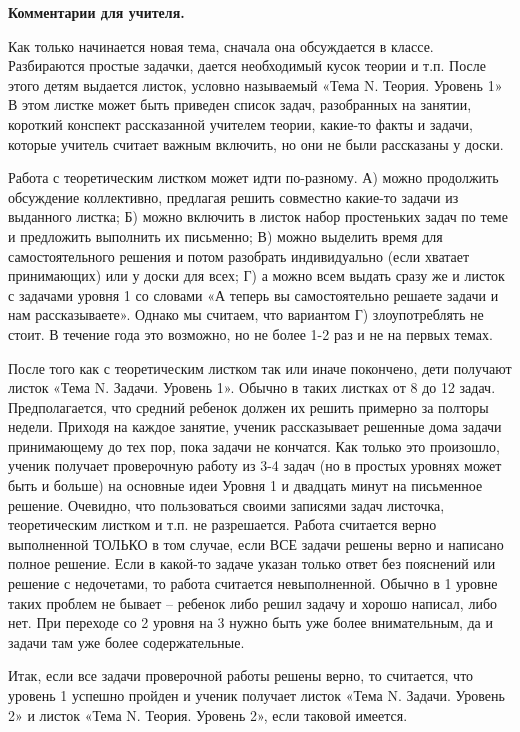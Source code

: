 \begin{center}
	\textbf{Комментарии для учителя.}
\end{center}

Как только начинается новая тема, сначала она обсуждается в классе. Разбираются простые задачки, дается необходимый кусок теории и т.п. После этого детям выдается листок, условно называемый «Тема N. Теория. Уровень 1» В этом листке может быть приведен список задач, разобранных на занятии, короткий конспект рассказанной учителем теории, какие-то факты и задачи, которые учитель считает важным включить, но они не были рассказаны у доски. 

Работа с теоретическим листком может идти по-разному. А) можно продолжить обсуждение коллективно, предлагая решить совместно какие-то задачи из выданного листка; Б) можно включить в листок набор простеньких задач по теме и предложить выполнить их письменно; В) можно выделить время для самостоятельного решения и потом разобрать индивидуально (если хватает принимающих) или у доски для всех; Г) а можно всем выдать сразу же и листок с задачами уровня 1 со словами «А теперь вы самостоятельно решаете задачи и нам рассказываете». Однако мы считаем, что вариантом Г) злоупотреблять не стоит. В течение года это возможно, но не более 1-2 раз и не на первых темах.

После того как с теоретическим листком так или иначе покончено, дети получают листок «Тема N. Задачи. Уровень 1». Обычно в таких листках от 8 до 12 задач. Предполагается, что средний ребенок должен их решить примерно за полторы недели. Приходя на каждое занятие, ученик рассказывает решенные дома задачи принимающему до тех пор, пока задачи не кончатся. Как только это произошло, ученик получает проверочную работу из 3-4 задач (но в простых уровнях может быть и больше) на основные идеи Уровня 1 и двадцать минут на письменное решение. Очевидно, что пользоваться своими записями задач листочка, теоретическим листком и т.п. не разрешается. 
Работа считается верно выполненной ТОЛЬКО в том случае, если ВСЕ задачи решены верно и написано полное решение. Если в какой-то задаче указан только ответ без пояснений или решение с недочетами, то работа считается невыполненной. Обычно в 1 уровне таких проблем не бывает – ребенок либо решил задачу и хорошо написал, либо нет. При переходе со 2 уровня на 3 нужно быть уже более внимательным, да и задачи там уже более содержательные.

Итак, если все задачи проверочной работы решены верно, то считается, что уровень 1 успешно пройден и ученик получает листок «Тема N. Задачи. Уровень 2» и листок «Тема N. Теория. Уровень 2», если таковой имеется.

